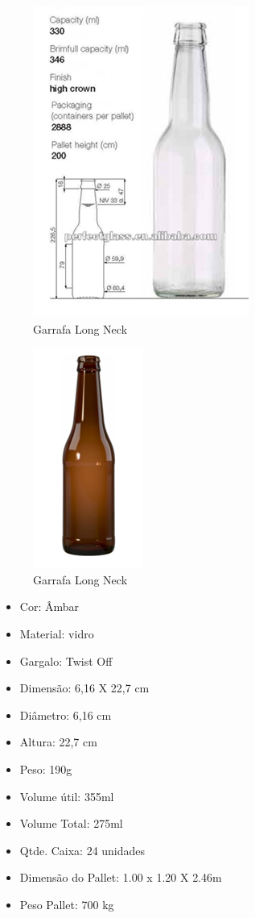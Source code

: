 \begin{figure}[!h]
	\centering
		\includegraphics[scale=0.4]{figuras/estrutura/24.png}
	\caption{Garrafa Long Neck}
\end{figure}

\begin{figure}[!h]
	\centering
		\includegraphics[scale=0.4]{figuras/estrutura/25.png}
	\caption{Garrafa Long Neck}
\end{figure}

\begin{itemize}
    \item Cor: Âmbar
    \item Material: vidro
    \item Gargalo: Twist Off
    \item Dimensão: 6,16 X 22,7 cm
    \item Diâmetro: 6,16 cm
    \item Altura: 22,7 cm
    \item Peso: 190g
    \item Volume útil: 355ml
    \item Volume Total: 275ml
    \item Qtde. Caixa: 24 unidades
    \item Dimensão do Pallet: 1.00 x 1.20 X 2.46m
    \item Peso Pallet: 700 kg
\end{itemize}

